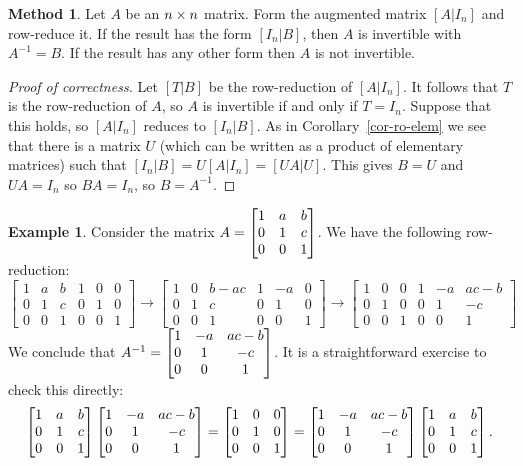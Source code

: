 \documentclass[reqno]{amsart}
\theoremstyle{definition}
\newtheorem{example}[theorem]{Example}
\newtheorem{method}[theorem]{Method}
\begin{document}
\begin{method}\label{meth-find-inverse}
 Let $A$ be an $n\times n$ matrix.  Form the augmented matrix $[A|I_n]$
 and row-reduce it.  If the result has the form $[I_n|B]$, then $A$ is
 invertible with $A^{-1}=B$.  If the result has any other form then
 $A$ is not invertible.
\end{method}

\begin{proof}[Proof of correctness]
 Let $[T|B]$ be the row-reduction of $[A|I_n]$.  It follows that $T$
 is the row-reduction of $A$, so $A$ is invertible if and only if
 $T=I_n$.  Suppose that this holds, so $[A|I_n]$ reduces to $[I_n|B]$.
 As in Corollary~\ref{cor-ro-elem} we see that there is a matrix $U$
 (which can be written as a product of elementary matrices) such that
 $[I_n|B]=U[A|I_n]=[UA|U]$.  This gives $B=U$ and $UA=I_n$ so
 $BA=I_n$, so $B=A^{-1}$.
\end{proof}

\begin{example}\label{eg-inverse-i}
 Consider the matrix $A=\left[\begin{matrix} 1&a&b\\0&1&c\\0&0&1\end{matrix}\right]$.  We have the
 following row-reduction:
 \[
  \left[\begin{array}{ccc|ccc}
   1 & a & b & 1 & 0 & 0 \\
   0 & 1 & c & 0 & 1 & 0 \\
   0 & 0 & 1 & 0 & 0 & 1
  \end{array}\right]
  \to
  \left[\begin{array}{ccc|ccc}
   1 & 0 & b-ac & 1 & -a & 0 \\
   0 & 1 & c    & 0 &  1 & 0 \\
   0 & 0 & 1    & 0 &  0 & 1
  \end{array}\right]
  \to
  \left[\begin{array}{ccc|ccc}
   1 & 0 & 0 & 1 & -a & ac-b \\
   0 & 1 & 0 & 0 &  1 &-c \\
   0 & 0 & 1 & 0 &  0 & 1
  \end{array}\right]
 \]
 We conclude that $A^{-1}=\left[\begin{matrix} 1&-a&ac-b\\ 0&1&-c\\0&0&1\end{matrix}\right]$.
 It is a straightforward exercise to check this directly:
 \[
  \left[\begin{matrix} 1&a&b\\0&1&c\\0&0&1\end{matrix}\right]
  \left[\begin{matrix} 1&-a&ac-b\\ 0&1&-c\\0&0&1\end{matrix}\right]
  =
  \left[\begin{matrix} 1&0&0 \\ 0&1&0 \\ 0&0&1 \end{matrix}\right]
  =
  \left[\begin{matrix} 1&-a&ac-b\\ 0&1&-c\\0&0&1\end{matrix}\right]
  \left[\begin{matrix} 1&a&b\\0&1&c\\0&0&1\end{matrix}\right].
 \]
\end{example}
\end{document}
